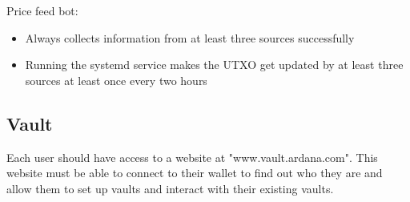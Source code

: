 \documentclass{article} %
\begin{document}
Price feed bot:
\begin{itemize}
  \item Always collects information from at least three sources successfully
  \item Running the systemd service makes the UTXO get updated by at least three
    sources at least once every two hours
\end{itemize}

%
%
%
%
\subsection{Vault}

Each user should have access to a website at "www.vault.ardana.com".
This website must be able to connect to their wallet to find out who they are
and allow them to set up vaults and interact with their existing vaults.
\end{document}
